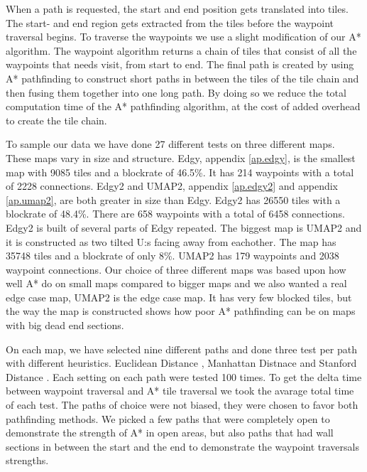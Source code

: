 \documentclass[a4paper]{article}
\begin{document}
When a path is requested, the start and end position gets translated into tiles. The start- and end region gets extracted from the tiles before the waypoint traversal begins. To traverse the waypoints we use a slight modification of our A* algorithm. The waypoint algorithm returns a chain of tiles that consist of all the waypoints that needs visit, from start to end. The final path is created by using A* pathfinding to construct short paths in between the tiles of the tile chain and then fusing them together into one long path. By doing so we reduce the total computation time of the A* pathfinding algorithm, at the cost of added overhead to create the tile chain.
	
To sample our data we have done 27 different tests on three different maps. These maps vary in size and structure. Edgy, appendix \ref{ap.edgy}, is the smallest map with 9085 tiles and a blockrate of 46.5\%. It has 214 waypoints with a total of 2228 connections. Edgy2 and UMAP2, appendix \ref{ap.edgy2} and appendix \ref{ap.umap2}, are both greater in size than Edgy. Edgy2 has 26550 tiles with a blockrate of 48.4\%. There are 658 waypoints with a total of 6458 connections. Edgy2 is built of several parts of Edgy repeated. The biggest map is UMAP2 and it is constructed as two tilted U:s facing away from eachother. The map has 35748 tiles and a blockrate of only 8\%. UMAP2 has 179 waypoints and 2038 waypoint connections. Our choice of three different maps was based upon how well A* do on small maps compared to bigger maps and we also wanted a real edge case map, UMAP2 is the edge case map. It has very few blocked tiles, but the way the map is constructed shows how poor A* pathfinding can be on maps with big dead end sections.
	
On each map, we have selected nine different paths and done three test per path with different heuristics. Euclidean Distance \cite{heuristicRef}, Manhattan Distnace \cite{heuristicRef} and Stanford Distance \cite{heuristicRef}.
Each setting on each path were tested 100 times. To get the delta time between waypoint traversal and A* tile traversal we took the avarage total time of each test. The paths of choice were not biased, they were chosen to favor both pathfinding methods. We picked a few paths that were completely open to demonstrate the strength of A* in open areas, but also paths that had wall sections in between the start and the end to demonstrate the waypoint traversals strengths.
\end{document}
